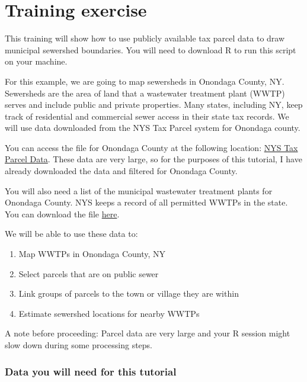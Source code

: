 \documentclass[
]{book}
\begin{document}
\section{Training exercise}\label{training-exercise}

This training will show how to use publicly available tax parcel data to draw municipal sewershed boundaries. You will need to download R to run this script on your machine.

For this example, we are going to map sewersheds in Onondaga County, NY. Sewersheds are the area of land that a wastewater treatment plant (WWTP) serves and include public and private properties. Many states, including NY, keep track of residential and commercial sewer access in their state tax records. We will use data downloaded from the NYS Tax Parcel system for Onondaga county.

You can access the file for Onondaga County at the following location: \href{https://data.gis.ny.gov/datasets/sharegisny::nys-tax-parcels-public/about?layer=1}{NYS Tax Parcel Data}. These data are very large, so for the purposes of this tutorial, I have already downloaded the data and filtered for Onondaga County.

You will also need a list of the municipal wastewater treatment plants for Onondaga County. NYS keeps a record of all permitted WWTPs in the state. You can download the file \href{https://data.ny.gov/Energy-Environment/Wastewater-Treatment-Plants/2v6p-juki/about_data}{here}.

We will be able to use these data to:

\begin{enumerate}
\def\labelenumi{\arabic{enumi})}
\item
  Map WWTPs in Onondaga County, NY
\item
  Select parcels that are on public sewer
\item
  Link groups of parcels to the town or village they are within
\item
  Estimate sewershed locations for nearby WWTPs
\end{enumerate}

A note before proceeding: Parcel data are very large and your R session might slow down during some processing steps.

\subsubsection{Data you will need for this tutorial}\label{data-you-will-need-for-this-tutorial}
\end{document}
